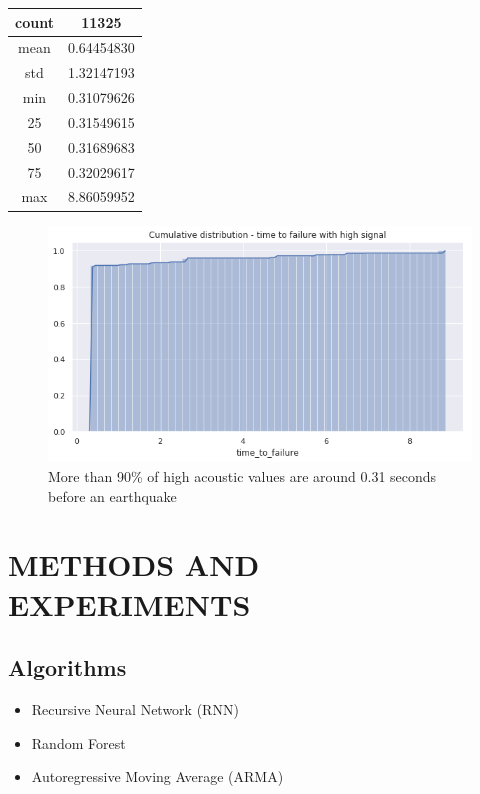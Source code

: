 \documentclass[]{llncs}
\begin{document}
\begin{tabular}{|c|c|}
	\hline 
	count & 11325 \\ 
	\hline 
	mean & 0.64454830 \\ 
	\hline 
	std & 1.32147193 \\ 
	\hline 
	min & 0.31079626 \\ 
	\hline 
	25 & 0.31549615 \\ 
	\hline 
	50 & 0.31689683 \\ 
	\hline 
	75 & 0.32029617 \\ 
	\hline 
	max & 8.86059952 \\ 
	\hline 
\end{tabular} 










\begin{figure}
	\centering
	\includegraphics[width=0.7\linewidth]{../GPUProject/moreThan90percent}
	\caption{More than 90\% of high acoustic values are around 0.31 seconds before an earthquake}
		\label{fig:morethan90percent}
	\end{figure}






\section{METHODS AND EXPERIMENTS}

\subsection{Algorithms}

\begin{itemize}
	\item Recursive Neural Network (RNN)
	\item Random Forest
	\item Autoregressive Moving Average (ARMA)
\end{itemize}
\end{document}
